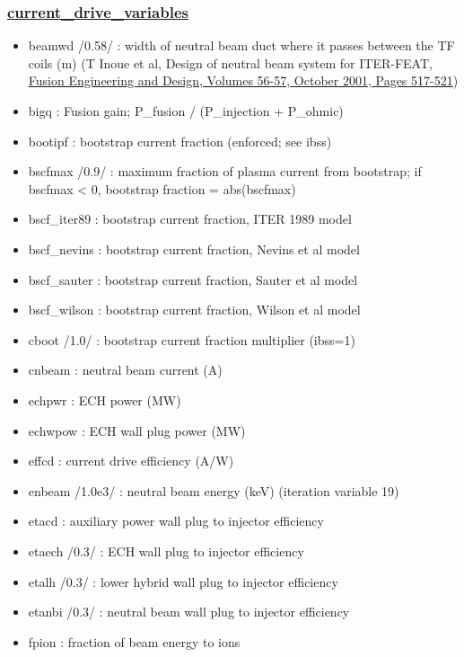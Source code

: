 \documentclass[]{article}
\providecommand{\tightlist}{%
  \setlength{\itemsep}{0pt}\setlength{\parskip}{0pt}}
\begin{document}
\subsubsection{\texorpdfstring{\href{current_drive_variables.html}{current\_drive\_variables}}{current\_drive\_variables}}\label{current_drive_variables}

\begin{itemize}
\tightlist
\item
  beamwd /0.58/ : width of neutral beam duct where it passes between the
  TF coils (m) (T Inoue et al, Design of neutral beam system for
  ITER-FEAT,
  \href{http://dx.doi.org/10.1016/S0920-3796(01)00339-8}{Fusion
  Engineering and Design, Volumes 56-57, October 2001, Pages 517-521})
\item
  bigq : Fusion gain; P\_fusion / (P\_injection + P\_ohmic)
\item
  bootipf : bootstrap current fraction (enforced; see ibss)
\item
  bscfmax /0.9/ : maximum fraction of plasma current from bootstrap; if
  bscfmax \textless{} 0, bootstrap fraction = abs(bscfmax)
\item
  bscf\_iter89 : bootstrap current fraction, ITER 1989 model
\item
  bscf\_nevins : bootstrap current fraction, Nevins et al model
\item
  bscf\_sauter : bootstrap current fraction, Sauter et al model
\item
  bscf\_wilson : bootstrap current fraction, Wilson et al model
\item
  cboot /1.0/ : bootstrap current fraction multiplier (ibss=1)
\item
  cnbeam : neutral beam current (A)
\item
  echpwr : ECH power (MW)
\item
  echwpow : ECH wall plug power (MW)
\item
  effcd : current drive efficiency (A/W)
\item
  enbeam /1.0e3/ : neutral beam energy (keV) (iteration variable 19)
\item
  etacd : auxiliary power wall plug to injector efficiency
\item
  etaech /0.3/ : ECH wall plug to injector efficiency
\item
  etalh /0.3/ : lower hybrid wall plug to injector efficiency
\item
  etanbi /0.3/ : neutral beam wall plug to injector efficiency
\item
  fpion : fraction of beam energy to ions

\end{itemize}
\end{document}
